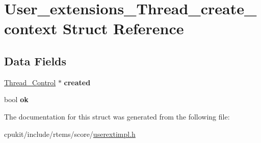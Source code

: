 \hypertarget{structUser__extensions__Thread__create__context}{}\section{User\+\_\+extensions\+\_\+\+Thread\+\_\+create\+\_\+context Struct Reference}
\label{structUser__extensions__Thread__create__context}
\subsection*{Data Fields}
\begin{DoxyCompactItemize}
\item 
\mbox{\label{structUser__extensions__Thread__create__context_ae5ba7ec7816c7fa9a190fc2a7e2ab0a7}} 
\mbox{\hyperlink{struct__Thread__Control}{Thread\+\_\+\+Control}} $\ast$ {\bfseries created}
\item 
\mbox{\label{structUser__extensions__Thread__create__context_aff20a1f5587b8e0fdac6ecaeef09e317}} 
bool {\bfseries ok}
\end{DoxyCompactItemize}


The documentation for this struct was generated from the following file\+:\begin{DoxyCompactItemize}
\item 
cpukit/include/rtems/score/\mbox{\hyperlink{userextimpl_8h}{userextimpl.\+h}}\end{DoxyCompactItemize}
